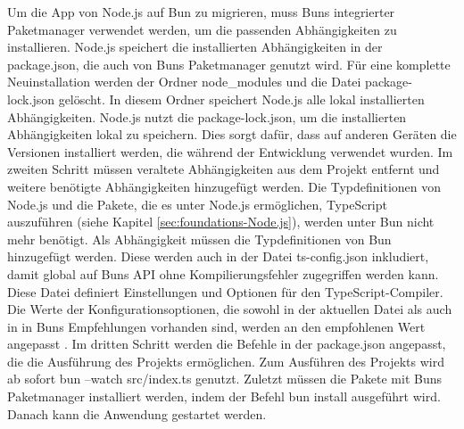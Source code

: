 \noindent
Um die App von Node.js auf Bun zu migrieren, muss Buns integrierter Paketmanager verwendet werden, um die passenden Abhängigkeiten zu installieren. Node.js speichert die installierten Abhängigkeiten in der \glqq package.json\grqq{}, die auch von Buns Paketmanager genutzt wird. Für eine komplette Neuinstallation werden der Ordner \glqq node\_modules\grqq{} und die Datei \glqq package-lock.json\grqq{} gelöscht. In diesem Ordner speichert Node.js alle lokal installierten Abhängigkeiten. Node.js nutzt die \glqq package-lock.json\grqq{}, um die installierten Abhängigkeiten lokal zu speichern. Dies sorgt dafür, dass auf anderen Geräten die Versionen installiert werden, die während der Entwicklung verwendet wurden. \newline
Im zweiten Schritt müssen veraltete Abhängigkeiten aus dem Projekt entfernt und weitere benötigte Abhängigkeiten hinzugefügt werden. Die Typdefinitionen von Node.js und die Pakete, die es unter Node.js ermöglichen, TypeScript auszuführen (siehe Kapitel \ref{sec:foundations-Node.js}), werden unter Bun nicht mehr benötigt. Als Abhängigkeit müssen die Typdefinitionen von Bun hinzugefügt werden. Diese werden auch in der Datei \glqq ts-config.json\grqq{} inkludiert, damit global auf Buns API ohne Kompilierungsfehler zugegriffen werden kann. Diese Datei definiert Einstellungen und Optionen für den TypeScript-Compiler. Die Werte der Konfigurationsoptionen, die sowohl in der aktuellen Datei als auch in in Buns Empfehlungen vorhanden sind, werden an den empfohlenen Wert angepasst \cite{OvenSh.2023}.\newline 
Im dritten Schritt werden die Befehle in der \glqq package.json\grqq{} angepasst, die die Ausführung des Projekts ermöglichen. Zum Ausführen des Projekts wird ab sofort \glqq bun --watch src/index.ts\grqq{} genutzt. Zuletzt müssen die Pakete mit Buns Paketmanager installiert werden, indem der Befehl \glqq bun install\grqq{} ausgeführt wird. Danach kann die Anwendung gestartet werden.\\

